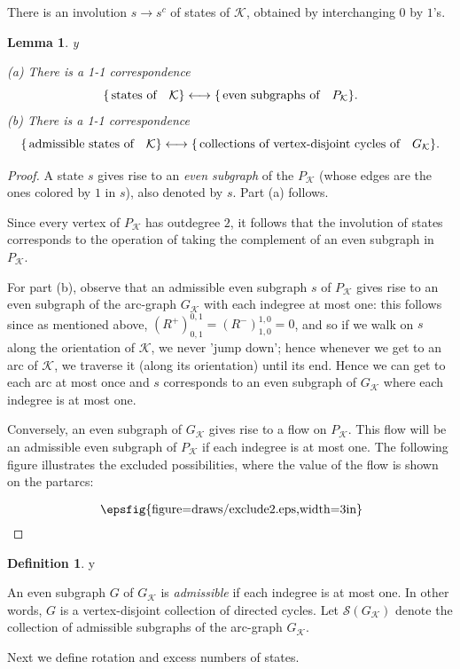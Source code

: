 \documentclass{amsart}
\theoremstyle{plain}
\newtheorem{lemma}[proposition]{Lemma}
\theoremstyle{definition}
\newtheorem{definition}[proposition]{Definition}
\theoremstyle{remark}
\def\printname#1{
        \if\draft y
                \smash{\makebox[0pt]{\hspace{-0.5in}
                        \raisebox{8pt}{\tt\tiny #1}}}
        \fi
}
\newcommand{\psdraw}[2]
         {\begin{array}{c} \hspace{-1.3mm}
        \raisebox{-4pt}{\epsfig{figure=draws/#1.eps,width=#2}}
        \hspace{-1.9mm}\end{array}}
\def\lbl#1{\label{#1}\printname{#1}}
\def\K{\mathcal K}
\def\Sev{{\mathcal S}}
\begin{document}
There is an involution $s\to s^c$ of states of $\K$, obtained by interchanging
$0$ by $1$'s.




\begin{lemma}
\lbl{lem.arc}
{\rm (a)}
There is a 1-1 correspondence 
$$
\{ \, \text{\rm{states of}} \quad \K \} \longleftrightarrow
\{ \, \text{\rm{even subgraphs of}} \quad P_{\K} \}.
$$
{\rm (b)}
There is a 1-1 correspondence 
$$
\{ \, \text{\rm{admissible states of}} \quad \K \} \longleftrightarrow
\{ \, \text{\rm{collections of vertex-disjoint cycles of}} \quad G_{\K} \}.
$$
\end{lemma}

\begin{proof}
A state $s$ gives rise to an {\em even subgraph} of the 
$P_{\K}$ (whose edges are the ones colored by $1$ in $s$), also denoted by
$s$. Part (a) follows.

Since every vertex of $P_{\K}$ has outdegree $2$, it follows that the
involution of states corresponds to the operation of taking the
complement of an even subgraph in $P_{\K}$.
 
For part (b), 
observe that an admissible even subgraph $s$ of $P_{\K}$ gives rise 
to an even subgraph of the arc-graph $G_{\K}$ with each indegree at most one:
this follows since as mentioned above, $(R^+)^{0,1}_{0,1}=(R^-)^{1,0}_{1,0}=0$,
and so if we walk on $s$ along the orientation of $\K$, we never 
'jump down'; hence whenever we get to an arc of $\K$, we traverse it 
(along its orientation) until its end. Hence we can get to each arc at most 
once and $s$ corresponds 
to an even subgraph of $G_{\K}$ where each indegree is at most one.

Conversely, an even subgraph of $G_{\K}$ gives rise to a flow
on $P_{\K}$. This flow will be an admissible even subgraph of 
$P_{\K}$ if each indegree is at most one. The following figure illustrates the
excluded possibilities, where the value of the flow is shown on the
partarcs:
$$
\psdraw{exclude2}{3in}
$$
\end{proof}

\begin{definition}
\lbl{def.adm}
An even subgraph $G$ of $G_{\K}$ is {\em admissible} if each indegree 
is at most one. In other words, $G$ is a vertex-disjoint collection of 
directed cycles. Let $\Sev(G_{\K})$ denote the collection of 
admissible subgraphs of the arc-graph $G_{\K}$. 
\end{definition}


Next we define rotation and excess numbers of states.
\end{document}

